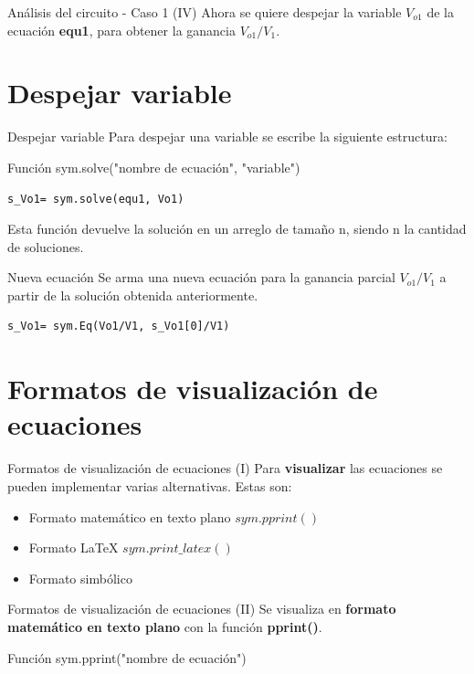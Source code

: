 \documentclass[14pt, aspectratio= 169]{beamer}
\begin{document}
\begin{frame}{Análisis del circuito - Caso 1 (IV)}
Ahora se quiere despejar la variable $V_{o1}$ de la ecuación \textbf{equ1}, para obtener la ganancia $V_{o1}/V_{1}$.
\end{frame}

\section{Despejar variable}
\begin{frame}[fragile]{Despejar variable}
Para despejar una variable se escribe la siguiente estructura:
\begin{block}{Función}
sym.solve("nombre de ecuación", "variable")
\end{block}
\begin{lstlisting}[style=python]
s_Vo1= sym.solve(equ1, Vo1)
\end{lstlisting}
Esta función devuelve la solución en un arreglo de tamaño n, siendo n la cantidad de soluciones.
\end{frame}


\begin{frame}[fragile]{Nueva ecuación}
Se arma una nueva ecuación para la ganancia parcial $V_{o1}/V_{1}$ a partir de la solución obtenida anteriormente.
\begin{lstlisting}[style=python]
s_Vo1= sym.Eq(Vo1/V1, s_Vo1[0]/V1)
\end{lstlisting}
\end{frame}

\section{Formatos de visualización de ecuaciones}
\begin{frame}{Formatos de visualización de ecuaciones (I)}
Para \textbf{visualizar} las ecuaciones se pueden implementar varias alternativas. Estas son:
\begin{itemize}
    \item Formato matemático en texto plano \space $sym.pprint()$
    \item Formato LaTeX \space $sym.print\_latex()$
    \item Formato simbólico
\end{itemize}
\end{frame}

% 
\begin{frame}{Formatos de visualización de ecuaciones (II)}
Se visualiza en \textbf{formato matemático en texto plano} con la función \textbf{pprint()}.
\begin{block}{Función}
sym.pprint("nombre de ecuación")
\end{block}
\end{frame}
\end{document}
